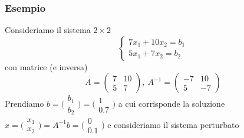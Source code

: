 \documentclass[12pt,a4paper]{article}
\begin{document}
\subsubsection*{Esempio}
Consideriamo il sistema $2\times 2$
\begin{equation*}
    \begin{cases}
        7x_1 + 10x_2 = b_1\\ 
        5x_1 + 7x_2 = b_2
    \end{cases}
\end{equation*}
con matrice (e inversa)
\begin{equation*}
    A=\begin{pmatrix}
        7 & 10 \\
        5 & 7
    \end{pmatrix}, \
    A^{-1}=\begin{pmatrix}
        -7 & 10 \\
        5 & -7 
    \end{pmatrix}
\end{equation*}
Prendiamo 
    $b=\bigl(\begin{smallmatrix}
    b_1 \\
    b_2
\end{smallmatrix}\bigr) = \bigl(\begin{smallmatrix}
    1 \\
    0.7
\end{smallmatrix}\bigr)$
     a cui corrisponde la soluzione $
x=\bigl(\begin{smallmatrix}
    x_1 \\
    x_2
\end{smallmatrix}\bigr) =A^{-1}b=\bigl(\begin{smallmatrix}
    0 \\
    0.1
\end{smallmatrix}\bigr)
$
 e consideriamo il sistema perturbato 
\end{document}

